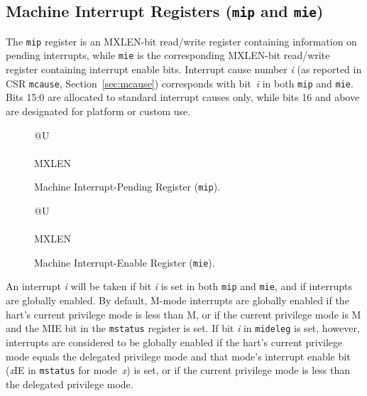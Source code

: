 \subsection{Machine Interrupt Registers ({\tt mip} and {\tt mie})}

The {\tt mip} register is an MXLEN-bit read/write register containing
information on pending interrupts, while {\tt mie} is the
corresponding MXLEN-bit read/write register containing interrupt enable
bits.
Interrupt cause number \textit{i} (as reported in CSR {\tt mcause},
Section~\ref{sec:mcause}) corresponds with bit~\textit{i} in both
{\tt mip} and {\tt mie}.
Bits 15:0 are allocated to standard interrupt causes only, while bits 16
and above are designated for platform or custom use.

\begin{figure}[h!]
{\footnotesize
\begin{center}
\begin{tabular}{@{}U}
 \\
\hline
{} \\
\hline
MXLEN \\
\end{tabular}
\end{center}
}
\vspace{-0.1in}
\caption{Machine Interrupt-Pending Register ({\tt mip}).}
\label{mipreg}
\end{figure}

\begin{figure}[h!]
{\footnotesize
\begin{center}
\begin{tabular}{@{}U}
 \\
\hline
{} \\
\hline
MXLEN \\
\end{tabular}
\end{center}
}
\vspace{-0.1in}
\caption{Machine Interrupt-Enable Register ({\tt mie}).}
\label{miereg}
\end{figure}

An interrupt \textit{i} will be taken if bit \textit{i} is set in both
{\tt mip} and {\tt mie}, and if interrupts are globally enabled.  By
default, M-mode interrupts are globally enabled if the hart's current
privilege mode is less than M, or if the current privilege mode is M
and the MIE bit in the {\tt mstatus} register is set.  If bit \textit{i}
in {\tt mideleg} is set, however, interrupts are considered to be
globally enabled if the hart's current privilege mode equals the
delegated privilege mode and that mode's interrupt enable
bit (\textit{x}\/IE in {\tt mstatus} for mode~\textit{x}) is set,
or if the current
privilege mode is less than the delegated privilege mode.

